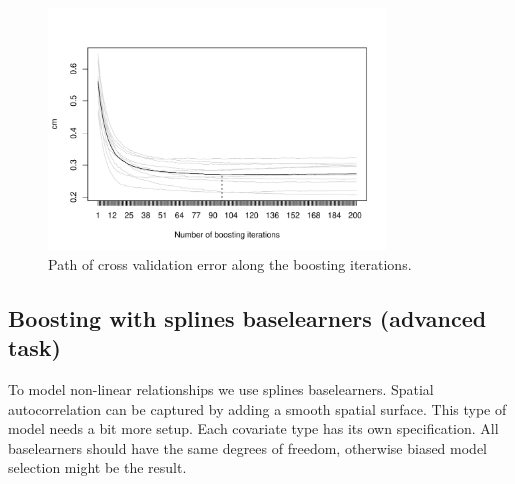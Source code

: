 \documentclass[11pt,a4paper,twoside]{article}\usepackage[]{graphicx}\usepackage[]{color}
\newenvironment{knitrout}{}{} %
\begin{document}
\begin{knitrout}
\color{fgcolor}\begin{figure}

{\centering \includegraphics[width=0.8\textwidth]{figure/glmboost-plot-1} 

}

\caption[Path of cross validation error along the boosting iterations]{Path of cross validation error along the boosting iterations.}\label{fig:glmboost-plot}
\end{figure}


\end{knitrout}


\subsection{Boosting with splines baselearners (advanced task)}

To model non-linear relationships we use splines baselearners. Spatial autocorrelation can be captured by adding a smooth spatial surface. This type of model needs a bit more setup. Each covariate type has its own specification. All baselearners should have the same degrees of freedom, otherwise biased model selection might be the result.  
\end{document}
